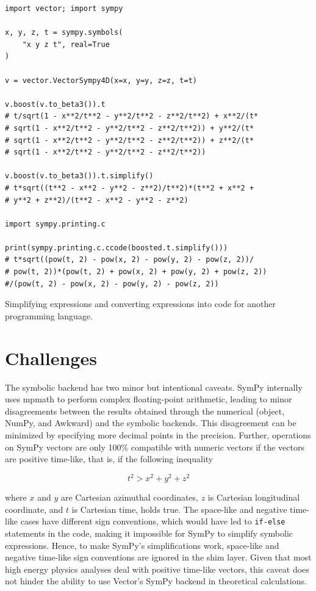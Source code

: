 \documentclass{webofc}
\begin{document}
\begin{listing}[!ht]
\begin{verbatim}
import vector; import sympy

x, y, z, t = sympy.symbols(
    "x y z t", real=True
)

v = vector.VectorSympy4D(x=x, y=y, z=z, t=t)

v.boost(v.to_beta3()).t
# t/sqrt(1 - x**2/t**2 - y**2/t**2 - z**2/t**2) + x**2/(t*
# sqrt(1 - x**2/t**2 - y**2/t**2 - z**2/t**2)) + y**2/(t*
# sqrt(1 - x**2/t**2 - y**2/t**2 - z**2/t**2)) + z**2/(t*
# sqrt(1 - x**2/t**2 - y**2/t**2 - z**2/t**2))

v.boost(v.to_beta3()).t.simplify()
# t*sqrt((t**2 - x**2 - y**2 - z**2)/t**2)*(t**2 + x**2 +
# y**2 + z**2)/(t**2 - x**2 - y**2 - z**2)

import sympy.printing.c

print(sympy.printing.c.ccode(boosted.t.simplify()))
# t*sqrt((pow(t, 2) - pow(x, 2) - pow(y, 2) - pow(z, 2))/
# pow(t, 2))*(pow(t, 2) + pow(x, 2) + pow(y, 2) + pow(z, 2))
#/(pow(t, 2) - pow(x, 2) - pow(y, 2) - pow(z, 2))
\end{verbatim}
\caption{Simplifying expressions and converting expressions into code for another programming language.}
\label{vector-sympy-extra}
\end{listing}

\section{Challenges}
\label{sec-challenges}

The symbolic backend has two minor but intentional caveats. SymPy internally uses mpmath \cite{mpmath} to perform complex floating-point arithmetic, leading to minor disagreements between the results obtained through the numerical (object, NumPy, and Awkward) and the symbolic backends. This disagreement can be minimized by specifying more decimal points in the precision. Further, operations on SymPy vectors are only 100\% compatible with numeric vectors if the vectors are positive time-like, that is, if the following inequality

\begin{equation} \label{ineq-positive-time}
t^{2} > x^{2} + y^{2} + z^{2}
\end{equation}

\noindent where $x$ and $y$ are Cartesian azimuthal coordinates, $z$ is Cartesian longitudinal coordinate, and $t$ is Cartesian time, holds true. The space-like and negative time-like cases have different sign conventions, which would have led to \texttt{if-else} statements in the code, making it impossible for SymPy to simplify symbolic expressions. Hence, to make SymPy's simplifications work, space-like and negative time-like sign conventions are ignored in the shim layer. Given that most high energy physics analyses deal with positive time-like vectors, this caveat does not hinder the ability to use Vector's SymPy backend in theoretical calculations.
\end{document}

